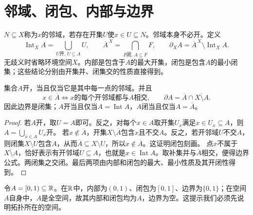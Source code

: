 \section{邻域、闭包、内部与边界}
\begin{definition}[邻域与集合的三个基本操作]
$N\subseteq X$称为$x$的邻域，若存在开集$U$使$x\in U\subseteq N$。邻域本身不必开。定义
\[
\operatorname{Int}_X A=\bigcup_{U\text{开},\,U\subseteq A}U,\qquad
\overline A^{\,X}=\bigcap_{F\text{闭},\,A\subseteq F}F,\qquad
\partial_XA=\overline A^{\,X}\setminus\operatorname{Int}_XA.
\]
无歧义时省略环境空间$X$。内部是包含于$A$的最大开集，闭包是包含$A$的最小闭集；这些结论分别由开集并、闭集交的性质直接得到。
\end{definition}
\begin{theorem}[邻域刻画与边界]
集合$A$开，当且仅当它是其中每一点的邻域。并且
\[
x\in\overline A\iff\text{$x$的每个开邻域都与$A$相交},\qquad
\partial A=\overline A\cap\overline{X\setminus A}.
\]
因此边界是闭集；$A$开当且仅当$A=\operatorname{Int}A$，$A$闭当且仅当$A=\overline A$。
\end{theorem}
\begin{proof}
若$A$开，取$U=A$即可。反之，对每个$x\in A$取开集$U_x$满足$x\in U_x\subseteq A$，则$A=\bigcup_{x\in A}U_x$开。
若$x\notin\overline A$，开集$X\setminus\overline A$包含$x$且不交$A$。反之，若开邻域$U$不交$A$，则闭集$X\setminus U$包含$A$，从而$\overline A\subseteq X\setminus U$，所以$x\notin\overline A$。这证明闭包刻画。
点$x$不属于$\overline{X\setminus A}$，恰好表示有开邻域$U\subseteq A$，也就是$x\in\operatorname{Int}A$。取补集并与$\overline A$相交，便得边界公式。两闭集之交闭。最后两项由内部和闭包的最大、最小性质及其开闭性得到。
\end{proof}
\begin{example}
令$A=[0,1)\subseteq\mathbb{R}$。在$\mathbb{R}$中，内部为$(0,1)$、闭包为$[0,1]$、边界为$\{0,1\}$；在空间$A$自身中，$A$是全空间，故其内部和闭包均为$A$，边界为空。这提示我们必须先说明拓扑所在的空间。
\end{example}


